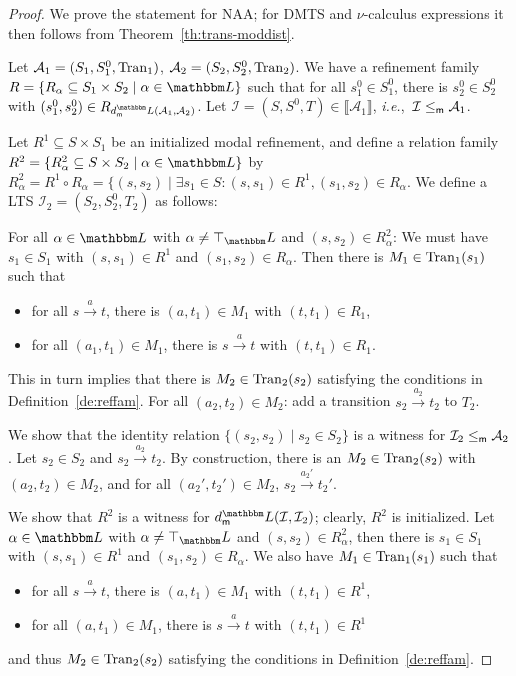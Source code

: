 \documentclass[twocolumn]{svjour3-dummy}
\newcommand*\ie{\textit{i.e.},}
\newcommand*\cI{\mathcal I}
\newcommand*{\must}[1]{\overset{#1}{\longrightarrow}}
\newcommand*\NAA{NAA\xspace}
\newcommand*\mr{\le_\textup{\textsf{m}}}
\newcommand*\cA{\mathcal A}
\newcommand*\Tran{\textup{\textrm{Tran}}}
\newcommand*\sem[1]{\llbracket #1\rrbracket}
\newcommand*\LL{\mathbbm L}
\begin{document}
\begin{proof}We prove the statement for \NAA; for DMTS and $\nu$-calculus
  expressions it then follows from Theorem~\ref{th:trans-moddist}.

  Let $\cA_1=( S_1, S^0_1, \Tran_1)$, $\cA_2=( S_2, S^0_2, \Tran_2)$.
  We have a refinement family $R=\{ R_\alpha\subseteq S_1\times S_2\mid
  \alpha\in \LL\}$ such that for all $s^0_1\in S^0_1$, there is
  $s^0_2\in S^0_2$ with $( s^0_1, s^0_2)\in R_{ \mdl( \cA_1, \cA_2)}$.
  Let $\cI=( S, S^0, T)\in \sem{ \cA_1}$, \ie~$\cI\mr \cA_1$.

  Let $R^1\subseteq S\times S_1$ be an initialized modal refinement,
  and define a relation family $R^2=\{ R^2_\alpha\subseteq S\times
  S_2\mid \alpha\in \LL\}$ by $R^2_\alpha= R^1\circ R_\alpha=\{( s,
  s_2)\mid \exists s_1\in S:( s, s_1)\in R^1,( s_1, s_2)\in
  R_\alpha$.  We define a LTS $\cI_2=( S_2, S^0_2, T_2)$ as follows:

  For all $\alpha\in \LL$ with $\alpha\ne \top_\LL$ and $( s, s_2)\in
  R^2_\alpha$: We must have $s_1\in S_1$ with $( s, s_1)\in R^1$ and $(
  s_1, s_2)\in R_\alpha$.  Then there is $M_1\in \Tran_1( s_1)$ such that
  \begin{itemize}
  \item for all $s\must{ a} t$, there is $( a, t_1)\in M_1$ with $( t,
    t_1)\in R_1$,
  \item for all $( a_1, t_1)\in M_1$, there is $s\must{ a} t$ with $( t,
    t_1)\in R_1$.
  \end{itemize}
  This in turn implies that there is $M_2\in \Tran_2( s_2)$ satisfying
  the conditions in Definition~\ref{de:reffam}.  For all $( a_2, t_2)\in
  M_2$: add a transition $s_2\must{ a_2} t_2$ to $T_2$.

  We show that the identity relation $\{( s_2, s_2)\mid s_2\in S_2\}$ is
  a witness for $\cI_2\mr \cA_2$.  Let $s_2\in S_2$ and $s_2\must{ a_2}
  t_2$.  By construction, there is an $M_2\in \Tran_2( s_2)$ with $(
  a_2, t_2)\in M_2$, and for all $( a_2', t_2')\in M_2$, $s_2\must{
    a_2'} t_2'$.

  We show that $R^2$ is a witness for $\mdl( \cI, \cI_2)$; clearly,
  $R^2$ is initialized.  Let $\alpha\in \LL$ with $\alpha\ne \top_\LL$
  and $( s, s_2)\in R^2_\alpha$, then there is $s_1\in S_1$ with $( s,
  s_1)\in R^1$ and $( s_1, s_2)\in R_\alpha$.  We also have $M_1\in
  \Tran_1( s_1)$ such that
  \begin{itemize}
  \item for all $s\must{ a} t$, there is $( a, t_1)\in M_1$ with $( t,
    t_1)\in R^1$,
  \item for all $( a, t_1)\in M_1$, there is $s\must{ a} t$ with $( t,
    t_1)\in R^1$
  \end{itemize}
  and thus $M_2\in \Tran_2( s_2)$ satisfying the conditions in
  Definition~\ref{de:reffam}.


\end{proof}
\end{document}
